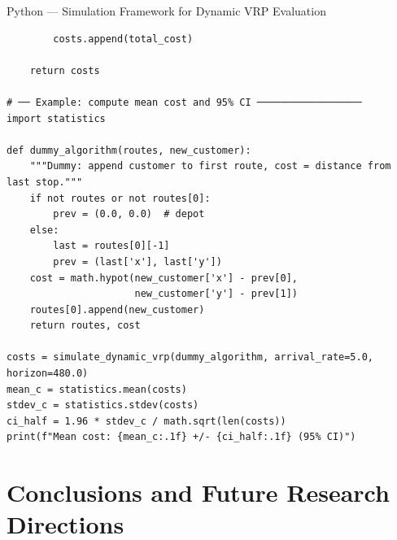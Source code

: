 \documentclass[aspectratio=169,10pt]{beamer}
\begin{document}
\begin{frame}[fragile]{Python — Simulation Framework for Dynamic VRP Evaluation}
\begin{lstlisting}
        costs.append(total_cost)

    return costs

# ── Example: compute mean cost and 95% CI ──────────────────
import statistics

def dummy_algorithm(routes, new_customer):
    """Dummy: append customer to first route, cost = distance from last stop."""
    if not routes or not routes[0]:
        prev = (0.0, 0.0)  # depot
    else:
        last = routes[0][-1]
        prev = (last['x'], last['y'])
    cost = math.hypot(new_customer['x'] - prev[0],
                      new_customer['y'] - prev[1])
    routes[0].append(new_customer)
    return routes, cost

costs = simulate_dynamic_vrp(dummy_algorithm, arrival_rate=5.0, horizon=480.0)
mean_c = statistics.mean(costs)
stdev_c = statistics.stdev(costs)
ci_half = 1.96 * stdev_c / math.sqrt(len(costs))
print(f"Mean cost: {mean_c:.1f} +/- {ci_half:.1f} (95% CI)")
\end{lstlisting}

\end{frame}

\section{Conclusions and Future Research Directions}
\end{document}
